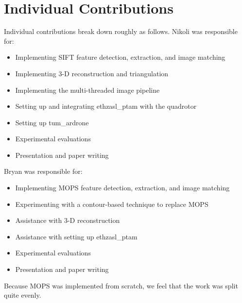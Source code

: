 \documentclass{acmsiggraph}
\begin{document}
\section{Individual Contributions}
Individual contributions break down roughly as follows. Nikoli was responsible for:
\begin{itemize}
\item Implementing SIFT feature detection, extraction, and image matching
\item Implementing 3-D reconstruction and triangulation
\item Implementing the multi-threaded image pipeline
\item Setting up and integrating ethzasl\_ptam with the quadrotor
\item Setting up tum\_ardrone
\item Experimental evaluations
\item Presentation and paper writing
\end{itemize}

Bryan was responsible for:
\begin{itemize}
\item Implementing MOPS feature detection, extraction, and image matching
\item Experimenting with a contour-based technique to replace MOPS
\item Assistance with 3-D reconstruction
\item Assistance with setting up ethzasl\_ptam
\item Experimental evaluations
\item Presentation and paper writing
\end{itemize}

Because MOPS was implemented from scratch, we feel that the work was split quite evenly.



\end{document}
